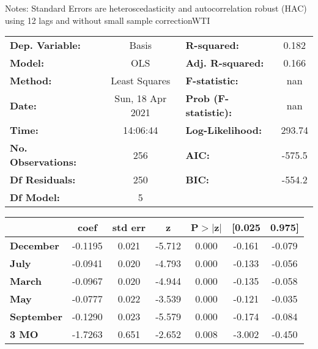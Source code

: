 Notes: \newline
 [1] Standard Errors are heteroscedasticity and autocorrelation robust (HAC) using 12 lags and without small sample correctionWTI\begin{center}
\begin{tabular}{lclc}
\toprule
\textbf{Dep. Variable:}    &      Basis       & \textbf{  R-squared:         } &     0.182   \\
\textbf{Model:}            &       OLS        & \textbf{  Adj. R-squared:    } &     0.166   \\
\textbf{Method:}           &  Least Squares   & \textbf{  F-statistic:       } &       nan   \\
\textbf{Date:}             & Sun, 18 Apr 2021 & \textbf{  Prob (F-statistic):} &      nan    \\
\textbf{Time:}             &     14:06:44     & \textbf{  Log-Likelihood:    } &    293.74   \\
\textbf{No. Observations:} &         256      & \textbf{  AIC:               } &    -575.5   \\
\textbf{Df Residuals:}     &         250      & \textbf{  BIC:               } &    -554.2   \\
\textbf{Df Model:}         &           5      & \textbf{                     } &             \\
\bottomrule
\end{tabular}
\begin{tabular}{lcccccc}
                   & \textbf{coef} & \textbf{std err} & \textbf{z} & \textbf{P$> |$z$|$} & \textbf{[0.025} & \textbf{0.975]}  \\
\midrule
\textbf{December}  &      -0.1195  &        0.021     &    -5.712  &         0.000        &       -0.161    &       -0.079     \\
\textbf{July}      &      -0.0941  &        0.020     &    -4.793  &         0.000        &       -0.133    &       -0.056     \\
\textbf{March}     &      -0.0967  &        0.020     &    -4.944  &         0.000        &       -0.135    &       -0.058     \\
\textbf{May}       &      -0.0777  &        0.022     &    -3.539  &         0.000        &       -0.121    &       -0.035     \\
\textbf{September} &      -0.1290  &        0.023     &    -5.579  &         0.000        &       -0.174    &       -0.084     \\
\textbf{3 MO}      &      -1.7263  &        0.651     &    -2.652  &         0.008        &       -3.002    &       -0.450     \\

\end{tabular}
\end{center}
